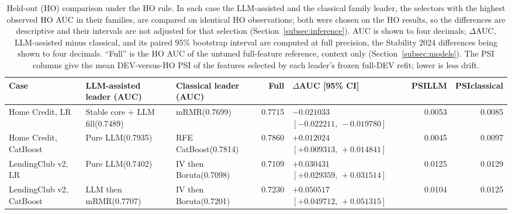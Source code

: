 \documentclass[final,5p,twocolumn]{elsarticle}
\begin{document}
\begin{table}[htbp]
\centering
\scriptsize
\setlength{\tabcolsep}{3pt}
\begin{threeparttable}
\caption{Held-out (HO) comparison under the HO rule. In each case the LLM-assisted and the classical family leader, the selectors with the highest observed HO AUC in their families, are compared on identical HO observations; both were chosen on the HO results, so the differences are descriptive and their intervals are not adjusted for that selection (Section~\ref{subsec:inference}). AUC is shown to four decimals; $\Delta$AUC, LLM-assisted minus classical, and its paired 95\% bootstrap interval are computed at full precision, the Stability 2024 differences being shown to four decimals. ``Full'' is the HO AUC of the untuned full-feature reference, context only (Section~\ref{subsec:models}). The PSI columns give the mean DEV-versus-HO PSI of the features selected by each leader's frozen full-DEV refit; lower is less drift.}
\label{tab:primary_results}
\begin{tabular}{@{}L{24mm}L{27mm}L{24mm}rL{38mm}rr@{}}
\toprule
Case & LLM-assisted leader (AUC) & Classical leader (AUC) & Full & $\Delta$AUC [95\% CI] & PSI\newline LLM & PSI\newline classical \\
\midrule
Home Credit, LR & Stable core + LLM fill\newline (0.7489) & mRMR\newline (0.7699) & 0.7715 & $-0.021033$\newline $[-0.022211,\,-0.019780]$ & 0.0053 & 0.0085 \\
\addlinespace
Home Credit, CatBoost & Pure LLM\newline (0.7935) & RFE CatBoost\newline (0.7814) & 0.7860 & $+0.012024$\newline $[+0.009313,\,+0.014841]$ & 0.0045 & 0.0097 \\
\addlinespace
LendingClub v2, LR & Pure LLM\newline (0.7402) & IV then Boruta\newline (0.7098) & 0.7109 & $+0.030431$\newline $[+0.029359,\,+0.031514]$ & 0.0125 & 0.0129 \\
\addlinespace
LendingClub v2, CatBoost & LLM then mRMR\newline (0.7707) & IV then Boruta\newline (0.7201) & 0.7230 & $+0.050517$\newline $[+0.049712,\,+0.051315]$ & 0.0104 & 0.0125 \\

\end{tabular}
\end{threeparttable}
\end{table}
\end{document}
